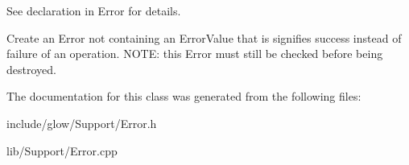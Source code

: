 See declaration in Error for details. 

Create an Error not containing an Error\+Value that is signifies success instead of failure of an operation. N\+O\+TE\+: this Error must still be checked before being destroyed. 

The documentation for this class was generated from the following files\+:\begin{DoxyCompactItemize}
\item 
include/glow/\+Support/Error.\+h\item 
lib/\+Support/Error.\+cpp\end{DoxyCompactItemize}
